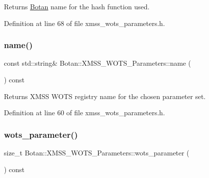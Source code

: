 \begin{DoxyReturn}{Returns}
\mbox{\hyperlink{namespace_botan}{Botan}} name for the hash function used. 
\end{DoxyReturn}


Definition at line 68 of file xmss\+\_\+wots\+\_\+parameters.\+h.

\mbox{\label{class_botan_1_1_x_m_s_s___w_o_t_s___parameters_a8ab4c1563ea45a0a612580f52b99ccd6}} 
\subsubsection{\texorpdfstring{name()}{name()}}
{\footnotesize\ttfamily const std\+::string\& Botan\+::\+X\+M\+S\+S\+\_\+\+W\+O\+T\+S\+\_\+\+Parameters\+::name (\begin{DoxyParamCaption}{ }\end{DoxyParamCaption}) const\hspace{0.3cm}{\ttfamily [inline]}}

\begin{DoxyReturn}{Returns}
X\+M\+SS W\+O\+TS registry name for the chosen parameter set. 
\end{DoxyReturn}


Definition at line 60 of file xmss\+\_\+wots\+\_\+parameters.\+h.

\mbox{\label{class_botan_1_1_x_m_s_s___w_o_t_s___parameters_a1226fc756a477864962d5a0d1c88184b}} 
\subsubsection{\texorpdfstring{wots\+\_\+parameter()}{wots\_parameter()}}
{\footnotesize\ttfamily size\+\_\+t Botan\+::\+X\+M\+S\+S\+\_\+\+W\+O\+T\+S\+\_\+\+Parameters\+::wots\+\_\+parameter (\begin{DoxyParamCaption}{ }\end{DoxyParamCaption}) const\hspace{0.3cm}{\ttfamily [inline]}}

